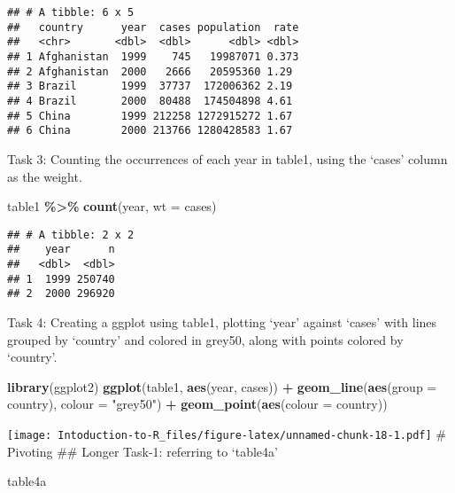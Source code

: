 \documentclass[
]{article}
\newenvironment{Shaded}{\begin{snugshade}}{\end{snugshade}}
\newcommand{\AttributeTok}[1]{\textcolor[rgb]{0.13,0.29,0.53}{#1}}
\newcommand{\FunctionTok}[1]{\textcolor[rgb]{0.13,0.29,0.53}{\textbf{#1}}}
\newcommand{\NormalTok}[1]{#1}
\newcommand{\SpecialCharTok}[1]{\textcolor[rgb]{0.81,0.36,0.00}{\textbf{#1}}}
\newcommand{\StringTok}[1]{\textcolor[rgb]{0.31,0.60,0.02}{#1}}
\begin{document}
\begin{verbatim}
## # A tibble: 6 x 5
##   country      year  cases population  rate
##   <chr>       <dbl>  <dbl>      <dbl> <dbl>
## 1 Afghanistan  1999    745   19987071 0.373
## 2 Afghanistan  2000   2666   20595360 1.29 
## 3 Brazil       1999  37737  172006362 2.19 
## 4 Brazil       2000  80488  174504898 4.61 
## 5 China        1999 212258 1272915272 1.67 
## 6 China        2000 213766 1280428583 1.67
\end{verbatim}

Task 3: Counting the occurrences of each year in table1, using the
`cases' column as the weight.

\begin{Shaded}
\begin{Highlighting}[]
\NormalTok{table1 }\SpecialCharTok{\%\textgreater{}\%} 
  \FunctionTok{count}\NormalTok{(year, }\AttributeTok{wt =}\NormalTok{ cases)}
\end{Highlighting}
\end{Shaded}

\begin{verbatim}
## # A tibble: 2 x 2
##    year      n
##   <dbl>  <dbl>
## 1  1999 250740
## 2  2000 296920
\end{verbatim}

Task 4: Creating a ggplot using table1, plotting `year' against `cases'
with lines grouped by `country' and colored in grey50, along with points
colored by `country'.

\begin{Shaded}
\begin{Highlighting}[]
\FunctionTok{library}\NormalTok{(ggplot2)}
\FunctionTok{ggplot}\NormalTok{(table1, }\FunctionTok{aes}\NormalTok{(year, cases)) }\SpecialCharTok{+} 
  \FunctionTok{geom\_line}\NormalTok{(}\FunctionTok{aes}\NormalTok{(}\AttributeTok{group =}\NormalTok{ country), }\AttributeTok{colour =} \StringTok{"grey50"}\NormalTok{) }\SpecialCharTok{+} 
  \FunctionTok{geom\_point}\NormalTok{(}\FunctionTok{aes}\NormalTok{(}\AttributeTok{colour =}\NormalTok{ country))}
\end{Highlighting}
\end{Shaded}

\texttt{[image: Intoduction-to-R\_files/figure-latex/unnamed-chunk-18-1.pdf]}
\# Pivoting \#\# Longer Task-1: referring to `table4a'

\begin{Shaded}
\begin{Highlighting}[]
\NormalTok{table4a}
\end{Highlighting}
\end{Shaded}
\end{document}
